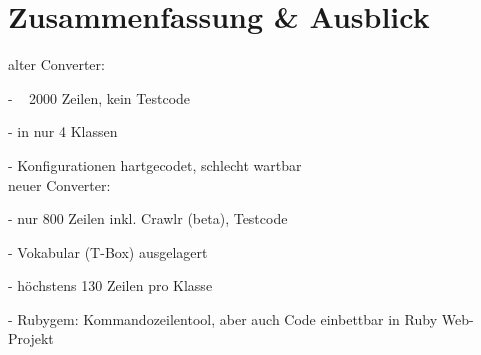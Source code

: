 \documentclass[runningheads,a4paper]{llncs}
\begin{document}
\section{Zusammenfassung \& Ausblick}
alter Converter:

- ~ 2000 Zeilen, kein Testcode

- in nur 4 Klassen

- Konfigurationen hartgecodet, schlecht wartbar
\\
neuer Converter:

- nur 800 Zeilen inkl. Crawlr (beta), Testcode

- Vokabular (T-Box) ausgelagert

- höchstens 130 Zeilen pro Klasse

- Rubygem: Kommandozeilentool, aber auch Code einbettbar in Ruby Web-Projekt


\nocite{url_dl_primer}



\end{document}
